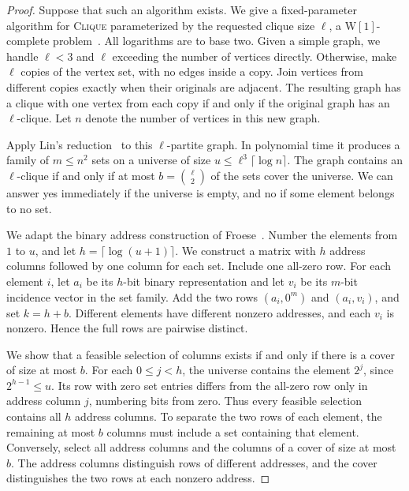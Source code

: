 \documentclass[11pt]{article}
\newcommand{\problem}[1]{\textsc{#1}}
\begin{document}
\begin{proof}
Suppose that such an algorithm exists. We give a fixed-parameter algorithm
for \problem{Clique} parameterized by the requested clique size \(\ell\),
a \(\mathrm{W[1]}\)-complete problem~\cite{df}. All logarithms are to base two.
Given a simple graph, we handle \(\ell<3\) and \(\ell\) exceeding the
number of vertices directly. Otherwise, make \(\ell\) copies of the vertex
set, with no edges inside a copy. Join vertices from different copies exactly
when their originals are adjacent. The resulting graph has a clique with one
vertex from each copy if and only if the original graph has an
\(\ell\)-clique. Let \(n\) denote the number of vertices in this new graph.

Apply Lin's reduction~\cite[Lemma~14]{lin} to this \(\ell\)-partite graph.
In polynomial time it produces a family of \(m\le n^2\) sets on a universe
of size \(u\le \ell^3\lceil\log n\rceil\). The graph contains an
\(\ell\)-clique if and only if at most \(b=\binom{\ell}{2}\) of the sets
cover the universe. We can answer yes immediately if the universe is empty,
and no if some element belongs to no set.

We adapt the binary address construction of Froese~\cite[Theorem~4.1]{froese}.
Number the elements from \(1\) to \(u\), and let
\(h=\lceil\log(u+1)\rceil\). We construct a matrix with \(h\) address
columns followed by one column for each set. Include one all-zero row.
For each element \(i\), let \(a_i\) be its \(h\)-bit binary representation
and let \(v_i\) be its \(m\)-bit incidence vector in the set family.
Add the two rows \((a_i,0^m)\) and \((a_i,v_i)\), and set \(k=h+b\).
Different elements have different nonzero addresses, and each \(v_i\) is
nonzero. Hence the full rows are pairwise distinct.

We show that a feasible selection of columns exists if and only if there
is a cover of size at most \(b\). For each \(0\le j<h\), the universe
contains the element \(2^j\), since \(2^{h-1}\le u\). Its row with zero
set entries differs from the all-zero row only in address column \(j\),
numbering bits from zero. Thus every feasible selection contains all \(h\)
address columns. To separate the two rows of each element, the remaining at
most \(b\) columns must include a set containing that element. Conversely,
select all address columns and the columns of a cover of size at most \(b\).
The address columns distinguish rows of different addresses, and the cover
distinguishes the two rows at each nonzero address.


\end{proof}
\end{document}
